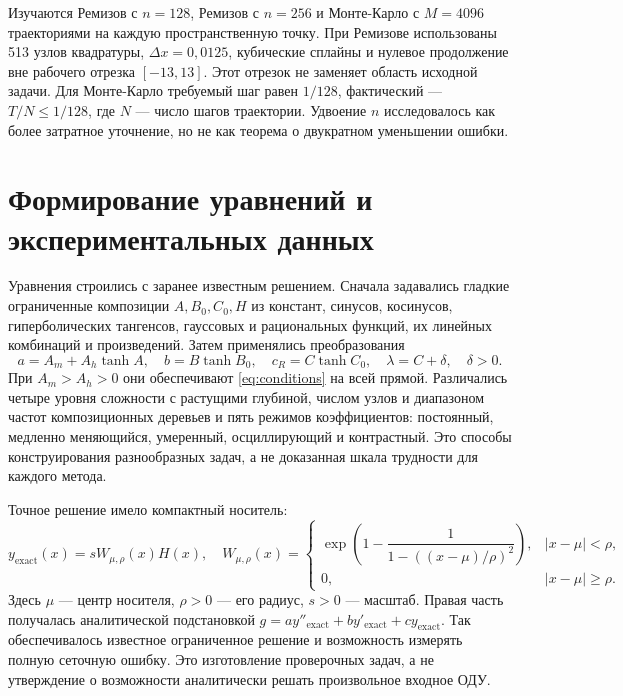 Изучаются Ремизов с $n=128$, Ремизов с $n=256$ и Монте-Карло с $M=4096$ траекториями на каждую пространственную точку. При Ремизове использованы 513 узлов квадратуры, $\Delta x=0{,}0125$, кубические сплайны и нулевое продолжение вне рабочего отрезка $[-13,13]$. Этот отрезок не заменяет область исходной задачи. Для Монте-Карло требуемый шаг равен $1/128$, фактический --- $T/N\le1/128$, где $N$ --- число шагов траектории. Удвоение $n$ исследовалось как более затратное уточнение, но не как теорема о двукратном уменьшении ошибки.

\section{Формирование уравнений и экспериментальных данных}
Уравнения строились с заранее известным решением. Сначала задавались гладкие ограниченные композиции $A,B_0,C_0,H$ из констант, синусов, косинусов, гиперболических тангенсов, гауссовых и рациональных функций, их линейных комбинаций и произведений. Затем применялись преобразования
\begin{equation}\label{eq:construction}
a=A_m+A_h\tanh A,\quad b=B\tanh B_0,\quad
c_R=C\tanh C_0,\quad \lambda=C+\delta,\quad\delta>0.
\end{equation}
При $A_m>A_h>0$ они обеспечивают \eqref{eq:conditions} на всей прямой. Различались четыре уровня сложности с растущими глубиной, числом узлов и диапазоном частот композиционных деревьев и пять режимов коэффициентов: постоянный, медленно меняющийся, умеренный, осциллирующий и контрастный. Это способы конструирования разнообразных задач, а не доказанная шкала трудности для каждого метода.

Точное решение имело компактный носитель:
\begin{equation}\label{eq:manufactured}
y_{\mathrm{exact}}(x)=sW_{\mu,\rho}(x)H(x),\quad
W_{\mu,\rho}(x)=\begin{cases}\exp\!\left(1-\dfrac1{1-((x-\mu)/\rho)^2}\right),&|x-\mu|<\rho,\\0,&|x-\mu|\ge\rho.\end{cases}
\end{equation}
Здесь $\mu$ --- центр носителя, $\rho>0$ --- его радиус, $s>0$ --- масштаб. Правая часть получалась аналитической подстановкой $g=ay''_{\mathrm{exact}}+by'_{\mathrm{exact}}+cy_{\mathrm{exact}}$. Так обеспечивалось известное ограниченное решение и возможность измерять полную сеточную ошибку. Это изготовление проверочных задач, а не утверждение о возможности аналитически решать произвольное входное ОДУ.

